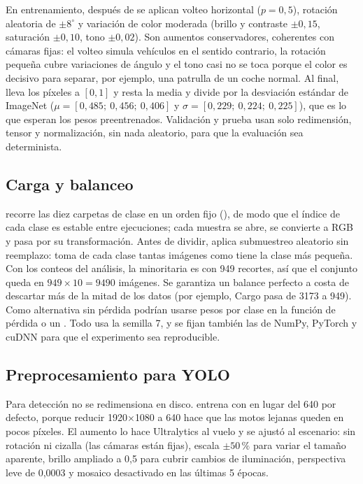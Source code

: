 \documentclass[11pt,a4paper]{article}
\begin{document}
En entrenamiento, después de  se aplican volteo horizontal ($p = 0{,}5$), rotación aleatoria de $\pm 8^\circ$ y variación de color moderada (brillo y contraste $\pm 0{,}15$, saturación $\pm 0{,}10$, tono $\pm 0{,}02$). Son aumentos conservadores, coherentes con cámaras fijas: el volteo simula vehículos en el sentido contrario, la rotación pequeña cubre variaciones de ángulo y el tono casi no se toca porque el color es decisivo para separar, por ejemplo, una patrulla de un coche normal. Al final,  lleva los píxeles a $[0, 1]$ y  resta la media y divide por la desviación estándar de ImageNet ($\mu = [0{,}485;\ 0{,}456;\ 0{,}406]$ y $\sigma = [0{,}229;\ 0{,}224;\ 0{,}225]$), que es lo que esperan los pesos preentrenados. Validación y prueba usan solo redimensión, tensor y normalización, sin nada aleatorio, para que la evaluación sea determinista.

\subsection{Carga y balanceo}

 recorre las diez carpetas de clase en un orden fijo (), de modo que el índice de cada clase es estable entre ejecuciones; cada muestra se abre, se convierte a RGB y pasa por su transformación. Antes de dividir,  aplica submuestreo aleatorio sin reemplazo: toma de cada clase tantas imágenes como tiene la clase más pequeña. Con los conteos del análisis, la minoritaria es  con 949 recortes, así que el conjunto queda en $949 \times 10 = 9490$ imágenes. Se garantiza un balance perfecto a costa de descartar más de la mitad de los datos (por ejemplo, Cargo pasa de 3173 a 949). Como alternativa sin pérdida podrían usarse pesos por clase en la función de pérdida o un . Todo usa la semilla 7, y se fijan también las de NumPy, PyTorch y cuDNN para que el experimento sea reproducible.

\subsection{Preprocesamiento para YOLO}

Para detección no se redimensiona en disco.  entrena con  en lugar del 640 por defecto, porque reducir 1920$\times$1080 a 640 hace que las motos lejanas queden en pocos píxeles. El aumento lo hace Ultralytics al vuelo y se ajustó al escenario: sin rotación ni cizalla (las cámaras están fijas), escala $\pm 50\,\%$ para variar el tamaño aparente, brillo ampliado a 0,5 para cubrir cambios de iluminación, perspectiva leve de 0,0003 y mosaico desactivado en las últimas 5 épocas.
\end{document}

